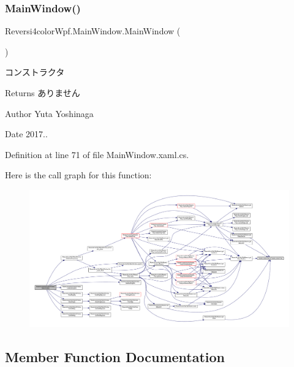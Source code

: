 \subsubsection{\texorpdfstring{Main\+Window()}{MainWindow()}}
{\footnotesize\ttfamily Reversi4color\+Wpf.\+Main\+Window.\+Main\+Window (\begin{DoxyParamCaption}{ }\end{DoxyParamCaption})}



コンストラクタ 

\begin{DoxyReturn}{Returns}
ありません 
\end{DoxyReturn}
\begin{DoxyAuthor}{Author}
Yuta Yoshinaga 
\end{DoxyAuthor}
\begin{DoxyDate}{Date}
2017.. 
\end{DoxyDate}


Definition at line 71 of file Main\+Window.\+xaml.\+cs.

Here is the call graph for this function\+:
\nopagebreak
\begin{figure}[H]
\begin{center}
\leavevmode
\includegraphics[width=350pt]{class_reversi4color_wpf_1_1_main_window_ad472ea40f8c1574627f7d855cd6515f1_cgraph}
\end{center}
\end{figure}


\subsection{Member Function Documentation}
\mbox{\label{class_reversi4color_wpf_1_1_main_window_aba5f0e0ddcb0c9f436a2f9ee5916b47f}} 
